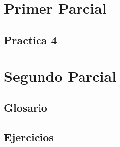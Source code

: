 \documentclass{book}
\begin{document}
\maketitle

\chapter{Primer Parcial}
\setcounter{section}{3}
\section{Practica 4}
\setcounter{ejercicio}{6}
\begin{ejercicio}
\end{ejercicio}

\chapter{Segundo Parcial}
\section{Glosario}
\section{Ejercicios}
\end{document}
